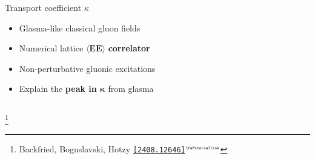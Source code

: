\documentclass[aspectratio=169,11pt,usenames,dvipsnames]{beamer}
\renewcommand{\thefootnote}{\color{customblue}\faPaperPlaneO}
\newcommand\blfootnote[1]{%
  \begingroup
  \renewcommand\thefootnote{}\footnote{#1}%
  \addtocounter{footnote}{-1}%
  \endgroup
}
\begin{document}
\begin{frame}[t]
\begin{columns}[onlytextwidth,t]
        \begin{center}
            {\Large\color{palteal} Transport coefficient $\kappa$ \\[10pt]}
            \footnotesize
                \begin{itemize}
                    \item {\color{lightgray}Glasma-like classical gluon fields}
                    \item {\color{lightgray}Numerical lattice $\boldsymbol{\langle EE\rangle}$ {\bfseries  correlator}}
                    \item {\color{lightgray}Non-perturbative gluonic excitations}
                    \item {\color{lightgray}Explain the {\bfseries peak in $\boldsymbol{\kappa}$} from glasma}
                \end{itemize}
        \end{center}
    \end{columns}
    \blfootnote{\scriptsize Backfried, Boguslavski, Hotzy \href{https://arxiv.org/abs/2408.12646}{\color{palgold}\texttt{[2408.12646]}$^\text{\tiny\faExternalLink}$}}
\end{frame}



\end{document}
